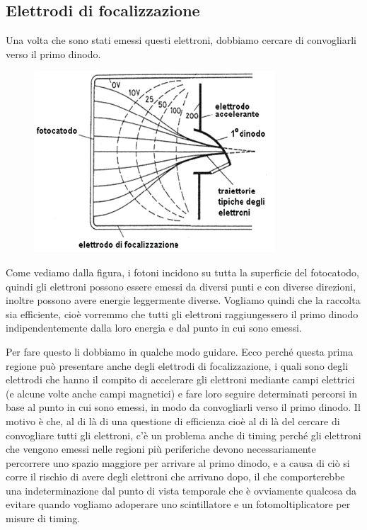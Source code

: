 \subsection{Elettrodi di focalizzazione}
Una volta che sono stati emessi questi elettroni, dobbiamo cercare di convogliarli verso il primo dinodo.

\begin{minipage}{0.38\textwidth}
   \begin{figure}[H]
      \centering
      \includegraphics[width=\textwidth]{immagini/elettrodo_di_focalizzazione.png}
   \end{figure}
\end{minipage}
\begin{minipage}{0.61\textwidth}
   \vspace{0.15cm}Come vediamo dalla figura, i fotoni incidono su tutta la superficie del fotocatodo, quindi gli elettroni possono essere emessi da diversi punti e con diverse direzioni, inoltre possono avere energie leggermente diverse. Vogliamo quindi che la raccolta sia efficiente, cioè vorremmo che tutti gli elettroni raggiungessero il primo dinodo indipendentemente dalla loro energia e dal punto in cui sono emessi.
\end{minipage}

\vspace{0.3cm}Per fare questo li dobbiamo in qualche modo guidare. Ecco perché questa prima regione può presentare anche degli elettrodi di focalizzazione, i quali sono degli elettrodi che hanno il compito di accelerare gli elettroni mediante campi elettrici (e alcune volte anche campi magnetici) e fare loro seguire determinati percorsi in base al punto in cui sono emessi, in modo da convogliarli verso il primo dinodo. Il motivo è che, al di là di una questione di efficienza cioè al di là del cercare di convogliare tutti gli elettroni, c'è un problema anche di timing perché gli elettroni che vengono emessi nelle regioni più periferiche devono necessariamente percorrere uno spazio maggiore per arrivare al primo dinodo, e a causa di ciò si corre il rischio di avere degli elettroni che arrivano dopo, il che comporterebbe una indeterminazione dal punto di vista temporale che è ovviamente qualcosa da evitare quando vogliamo adoperare uno scintillatore e un fotomoltiplicatore per misure di timing. 


